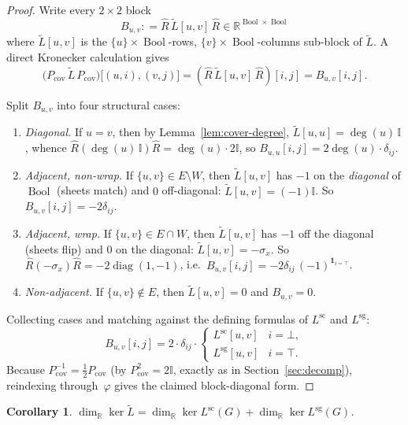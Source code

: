\documentclass[11pt,a4paper]{amsart}
\theoremstyle{plain}
\newtheorem{corollary}[theorem]{Corollary}
\theoremstyle{definition}
\theoremstyle{remark}
\DeclareMathOperator{\Ker}{ker}
\DeclareMathOperator{\diag}{diag}
\newcommand{\RR}{\mathbb{R}}
\newcommand{\II}{\mathbb{I}}
\newcommand{\tL}{\widetilde{L}}
\newcommand{\Lscalar}{L^{\operatorname{sc}}}
\newcommand{\Lsigned}{L^{\operatorname{sg}}}
\newcommand{\defeq}{\mathrel{\mathop:}=}
\begin{document}
\begin{proof}
Write every $2\times 2$ block
\[
  B_{u,v} \defeq \widehat R\,\tL[u,v]\,\widehat R \in
  \RR^{\operatorname{Bool}\times\operatorname{Bool}}
\]
where $\tL[u,v]$ is the $\{u\}\times\operatorname{Bool}$-rows,
$\{v\}\times \operatorname{Bool}$-columns sub-block of $\tL$. A
direct Kronecker calculation gives
\begin{equation}\label{eq:Pcov-identity}
  \bigl(P_{\mathrm{cov}}\,\tL\,P_{\mathrm{cov}}\bigr)\bigl[(u,i),(v,j)\bigr]
    = (\widehat R\,\tL[u,v]\,\widehat R)[i,j]
    = B_{u,v}[i,j].
\end{equation}

Split $B_{u,v}$ into four structural cases:
\begin{enumerate}[label=\textbf{(\alph*)}]
  \item \textit{Diagonal.} If $u=v$, then
  by Lemma~\ref{lem:cover-degree}, $\tL[u,u] = \deg(u)\,\II$,
  whence $\widehat R(\deg(u)\,\II)\widehat R =
  \deg(u)\cdot 2\II$, so $B_{u,u}[i,j] = 2\deg(u)\cdot \delta_{ij}$.
  \item \textit{Adjacent, non-wrap.} If $\{u,v\}\in E\setminus W$,
  then $\tL[u,v]$ has $-1$ on the \emph{diagonal} of
  $\operatorname{Bool}$ (sheets match) and $0$ off-diagonal:
  $\tL[u,v] = (-1)\II$. So
  $B_{u,v}[i,j] = -2\delta_{ij}$.
  \item \textit{Adjacent, wrap.} If $\{u,v\}\in E\cap W$, then
  $\tL[u,v]$ has $-1$ off the diagonal (sheets flip) and $0$ on
  the diagonal: $\tL[u,v] = -\sigma_x$. So
  $\widehat R(-\sigma_x)\widehat R = -2\diag(1,-1)$, i.e.\
  $B_{u,v}[i,j] = -2\delta_{ij}\,(-1)^{\mathbf{1}_{i=\top}}$.
  \item \textit{Non-adjacent.} If $\{u,v\}\notin E$, then
  $\tL[u,v]=0$ and $B_{u,v}=0$.
\end{enumerate}

Collecting cases and matching against the defining formulas of
$\Lscalar$ and $\Lsigned$:
\[
  B_{u,v}[i,j] = 2\cdot \delta_{ij}\cdot
  \begin{cases} \Lscalar[u,v] & i=\bot,\\
    \Lsigned[u,v] & i=\top. \end{cases}
\]
Because $P_{\mathrm{cov}}^{-1} = \tfrac{1}{2}P_{\mathrm{cov}}$
(by $P_{\mathrm{cov}}^2 = 2\II$, exactly as in Section~\ref{sec:decomp}),
reindexing through~$\varphi$ gives the claimed block-diagonal
form.
\end{proof}

\begin{corollary}\label{cor:cover-kernel}
$\dim_\RR \Ker\tL = \dim_\RR\Ker \Lscalar(G) +
    \dim_\RR\Ker \Lsigned(G)$.
\end{corollary}
\end{document}
